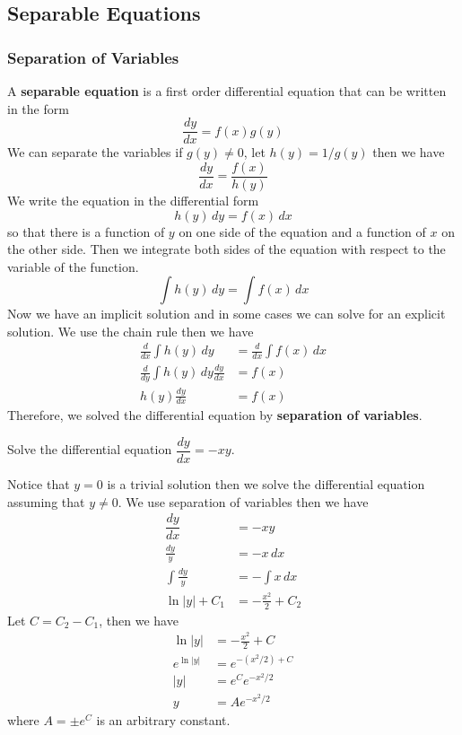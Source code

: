 \subsection{Separable Equations}
\subsubsection{Separation of Variables}
A \textbf{separable equation} is a first order differential equation that can
be written in the form \[\frac{dy}{dx}=f(x)g(y)\]
We can separate the variables if \(g(y)\neq0\), let \(h(y)=1/g(y)\) then we
have \[\frac{dy}{dx}=\frac{f(x)}{h(y)}\]
We write the equation in the differential form \[h(y)\,dy=f(x)\,dx\] so that
there is a function of \(y\) on one side of the equation and a function of
\(x\) on the other side.
Then we integrate both sides of the equation with respect to the variable of
the function.
\[\int h(y)\,dy=\int f(x)\,dx\]
Now we have an implicit solution and in some cases we can solve for an
explicit solution.
We use the chain rule then we have
\begin{align*}
    \frac{d}{dx}\int h(y)\,dy&=\frac{d}{dx}\int f(x)\,dx\\
    \frac{d}{dy}\int h(y)\,dy\frac{dy}{dx}&=f(x)\\h(y)\frac{dy}{dx}&=f(x)
\end{align*}
Therefore, we solved the differential equation by
\textbf{separation of variables}.
\begin{problem}
    Solve the differential equation \(\dfrac{dy}{dx}=-xy\).
\end{problem}
\begin{solution}
    Notice that \(y=0\) is a trivial solution then we solve the differential
    equation assuming that \(y\neq 0\).
    We use separation of variables then we have
    \begin{align*}
        \dfrac{dy}{dx}&=-xy\\\frac{dy}{y}&=-x\,dx\\\int\frac{dy}{y}
        &=-\int x\,dx\\\ln |y|+C_1&=-\frac{x^2}{2}+C_2
    \end{align*}
    Let \(C=C_2-C_1\), then we have
    \begin{align*}
        \ln |y|&=-\frac{x^2}{2}+C\\e^{\ln |y|}&=e^{-(x^2/2)+C}\\
        |y|&=e^Ce^{-x^2/2}\\y&=Ae^{-x^2/2}
    \end{align*}
    where \(A=\pm e^C\) is an arbitrary constant.
\end{solution}
